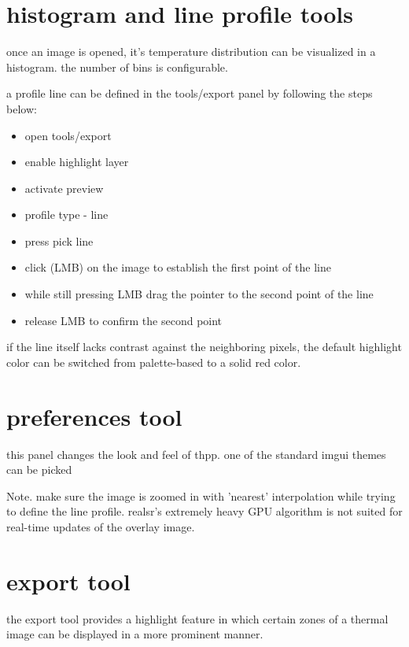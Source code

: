 \documentclass[12pt,twoside,a4paper,titlepage]{report}
\begin{document}
\section{histogram and line profile tools} \label{sec:tools-histogram}

once an image is opened, it's temperature distribution can be visualized in a histogram. the number of bins is configurable.

a profile line can be defined in the tools/export panel by following the steps below:
\begin{itemize}
    \item open tools/export
    \item enable highlight layer
    \item activate preview
    \item profile type - line
    \item press pick line
    \item click (LMB) on the image to establish the first point of the line
    \item while still pressing LMB drag the pointer to the second point of the line
    \item release LMB to confirm the second point
\end{itemize}

if the line itself lacks contrast against the neighboring pixels, the default highlight color can be switched from palette-based to a solid red color.


\section{preferences tool} \label{sec:tools-preferences}

this panel changes the look and feel of thpp. one of the standard imgui themes can be picked 

Note. make sure the image is zoomed in with 'nearest' interpolation while trying to define the line profile. realsr's extremely heavy GPU algorithm is not suited for real-time updates of the overlay image. 

\section{export tool} \label{sec:tools-export}

the export tool provides a highlight feature in which certain zones of a thermal image can be displayed in a more prominent manner.
\end{document}
